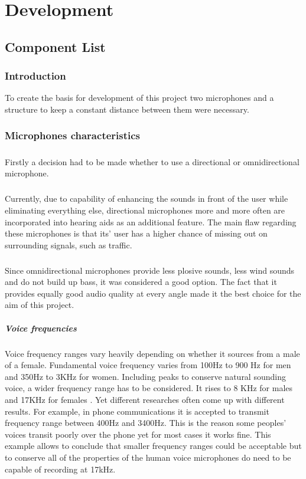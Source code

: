 \chapter{Development}\label{ch:development}
\section{Component List}
\subsection{Introduction}
To create the basis for development of this project two microphones and a structure to keep a constant distance between them were necessary.  

\subsection{Microphones characteristics}
\paragraph{}
Firstly a decision had to be made whether to use a directional or omnidirectional microphone. 
\paragraph{} Currently, due to capability of enhancing the sounds in front of the user while eliminating everything else, directional microphones more and more often are incorporated into hearing aids as an additional feature. The main flaw regarding these microphones is that its' user has a higher chance of missing out on surrounding signals, such as traffic. 
\paragraph{} Since omnidirectional microphones provide less plosive sounds, less wind sounds and do not build up bass, it was considered a good option. The fact that it provides equally good audio quality at every angle made it the best choice for the aim of this project.

\paragraph{Voice frequencies\\} Voice frequency ranges vary heavily depending on whether it sources from a male of a female. Fundamental voice frequency varies from 100Hz to 900 Hz for men and 350Hz to 3KHz for women. Including peaks to conserve natural sounding voice, a wider frequency range has to be considered. It rises to 8 KHz for males and 17KHz for females \cite{Seaindia}. Yet different researches often come up with different results. For example, in phone communications it is accepted to transmit frequency range between 400Hz and 3400Hz. This is the reason some peoples' voices transit poorly over the phone yet for most cases it works fine. This example allows to conclude that smaller frequency ranges could be acceptable but to conserve all of the properties of the human voice microphones do need to be capable of recording at 17kHz. 
